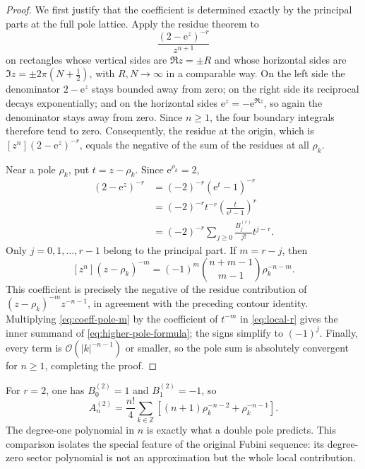 \documentclass[11pt,a4paper]{article}
\theoremstyle{definition}
\theoremstyle{remark}
\newcommand{\e}{\mathrm e}
\newcommand{\cO}{\mathcal O}
\newcommand{\coeff}[2]{\left[#1^{#2}\right]}
\newcommand{\Z}{\mathbb Z}
\begin{document}
\begin{proof}
We first justify that the coefficient is determined exactly by the principal
parts at the full pole lattice.  Apply the residue theorem to
\[
 \frac{(2-\e^z)^{-r}}{z^{n+1}}
\]
on rectangles whose vertical sides are \(\Re z=\pm R\) and whose horizontal
sides are \(\Im z=\pm 2\pi(N+\tfrac12)\), with \(R,N\to\infty\) in a
comparable way.  On the left side the denominator \(2-\e^z\) stays bounded
away from zero; on the right side its reciprocal decays exponentially; and on
the horizontal sides \(\e^z=-\e^{\Re z}\), so again the denominator stays
away from zero.  Since \(n\ge1\), the four boundary integrals therefore tend
to zero.  Consequently, the residue at the origin, which is
\(\coeff{z}{n}(2-\e^z)^{-r}\), equals the negative of the sum of the residues
at all \(\rho_k\).

Near a pole \(\rho_k\), put \(t=z-\rho_k\).  Since
\(
 \e^{\rho_k}=2
\),
\begin{align}
 (2-\e^z)^{-r}
 &=(-2)^{-r}(\e^t-1)^{-r}
 \nonumber\\
 &=(-2)^{-r}t^{-r}
   \left(\frac{t}{\e^t-1}\right)^r
 \nonumber\\
 &=(-2)^{-r}
   \sum_{j\ge0}\frac{B_j^{(r)}}{j!}t^{j-r}.
 \label{eq:local-r}
\end{align}
Only \(j=0,1,\ldots,r-1\) belong to the principal part.  If
\(m=r-j\), then
\begin{equation}\label{eq:coeff-pole-m}
 \coeff{z}{n}(z-\rho_k)^{-m}
 =(-1)^m\binom{n+m-1}{m-1}\rho_k^{-n-m}.
\end{equation}
This coefficient is precisely the negative of the residue contribution of
\((z-\rho_k)^{-m}z^{-n-1}\), in agreement with the preceding contour
identity.  Multiplying \eqref{eq:coeff-pole-m} by the coefficient of
\(t^{-m}\) in \eqref{eq:local-r} gives the inner summand of
\eqref{eq:higher-pole-formula}; the signs simplify to \((-1)^j\).  Finally,
every term is \(\cO(|k|^{-n-1})\) or smaller, so the pole sum is absolutely
convergent for \(n\ge1\), completing the proof.
\end{proof}

For \(r=2\), one has \(B_0^{(2)}=1\) and \(B_1^{(2)}=-1\), so
\begin{equation}\label{eq:r2}
 A_n^{(2)}=\frac{n!}{4}\sum_{k\in\Z}
 \left[(n+1)\rho_k^{-n-2}+\rho_k^{-n-1}\right].
\end{equation}
The degree-one polynomial in \(n\) is exactly what a double pole predicts.
This comparison isolates the special feature of the original Fubini sequence:
its degree-zero sector polynomial is not an approximation but the whole local
contribution.
\end{document}

